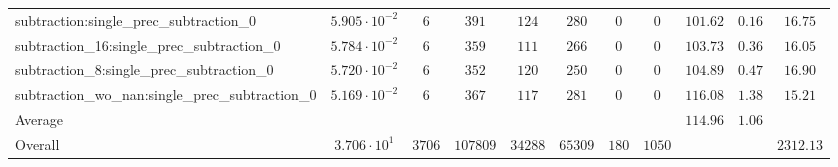 \begin{tabular}{|l|c|c|c|c|c|c|c|c|c|c|}
subtraction:single\_prec\_subtraction\_0                  & $ 5.905 \cdot 10^{-2} $ & $ 6      $ & $ 391    $ & $ 124   $ & $ 280   $ & $ 0   $ & $ 0    $ & $ 101.62      $ & $ 0.16    $ & $ 16.75   $ \\
subtraction\_16:single\_prec\_subtraction\_0              & $ 5.784 \cdot 10^{-2} $ & $ 6      $ & $ 359    $ & $ 111   $ & $ 266   $ & $ 0   $ & $ 0    $ & $ 103.73      $ & $ 0.36    $ & $ 16.05   $ \\
subtraction\_8:single\_prec\_subtraction\_0               & $ 5.720 \cdot 10^{-2} $ & $ 6      $ & $ 352    $ & $ 120   $ & $ 250   $ & $ 0   $ & $ 0    $ & $ 104.89      $ & $ 0.47    $ & $ 16.90   $ \\
subtraction\_wo\_nan:single\_prec\_subtraction\_0         & $ 5.169 \cdot 10^{-2} $ & $ 6      $ & $ 367    $ & $ 117   $ & $ 281   $ & $ 0   $ & $ 0    $ & $ 116.08      $ & $ 1.38    $ & $ 15.21   $ \\
\hline
Average                                                   & $                     $ & $        $ & $        $ & $       $ & $       $ & $     $ & $      $ & $ 114.96      $ & $ 1.06    $ & $         $ \\
\hline
Overall                                                   & $ 3.706 \cdot 10^{1}  $ & $ 3706   $ & $ 107809 $ & $ 34288 $ & $ 65309 $ & $ 180 $ & $ 1050 $ & $             $ & $         $ & $ 2312.13 $ \\
\hline
\end{tabular}
